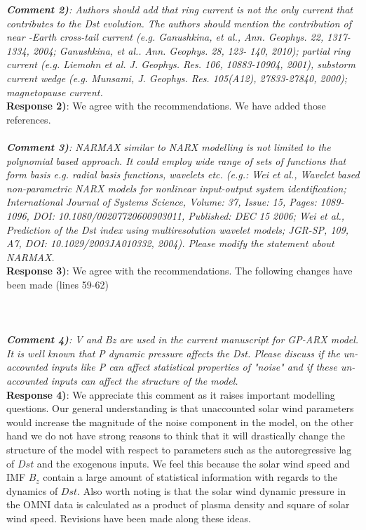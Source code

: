 \documentclass{article}
\begin{document}
{\it \textbf{Comment 2)}: Authors should add that ring current is not the only current that contributes to the Dst evolution. 
The authors should mention the contribution of near -Earth cross-tail current (e.g. Ganushkina, et al., Ann. Geophys. 22, 1317-1334, 2004; Ganushkina, et al.. Ann. Geophys. 28, 123- 140, 2010); partial ring current 
(e.g. Liemohn et al. J. Geophys. Res. 106, 10883-10904, 2001), substorm current wedge (e.g. Munsami, J. Geophys. Res. 105(A12), 27833-27840, 2000); magnetopause current. }\\

\textbf{Response 2)}: We agree with the recommendations. We have added those references.\\
\\

\textit{
\textbf{Comment 3)}: NARMAX similar to NARX modelling is not limited to the polynomial based approach. It could employ wide range of sets of functions that form basis e.g. radial basis functions, wavelets etc. (e.g.: Wei et al., Wavelet based non-parametric NARX models for nonlinear input-output system identification; International Journal of Systems Science, Volume: 37, Issue: 15, Pages: 1089-1096, DOI: 10.1080/00207720600903011, Published: DEC 15 2006; Wei et al., Prediction of the Dst index using multiresolution wavelet models; JGR-SP, 109, A7, DOI: 10.1029/2003JA010332, 2004). Please modify the statement about NARMAX. 
}\\

\textbf{Response 3)}: We agree with the recommendations. The following changes have been made (lines 59-62)\\
\\
\\
\\

\textit{
\textbf{Comment 4)}: V and Bz are used in the current manuscript for GP-ARX model. It is well known that P dynamic pressure affects the Dst. Please discuss if the un-accounted inputs like P can affect statistical properties of "noise" and if these un-accounted inputs can affect the structure of the model.}\\ 

\textbf{Response 4)}: We appreciate this comment as it raises important modelling questions. Our general understanding is that unaccounted solar wind parameters would increase the magnitude of the noise component in the model, on the other hand we do not have strong reasons to think that it will drastically change the structure of the model with respect to parameters such as the autoregressive lag of $Dst$ and the exogenous inputs. We feel this because the solar wind speed and IMF $B_z$ contain a large amount of statistical information with regards to the dynamics of $Dst$. Also worth noting is that the solar wind dynamic pressure in the OMNI data is calculated as a product of plasma density and square of solar wind speed. Revisions have been made along these ideas. \\ 
\end{document}
